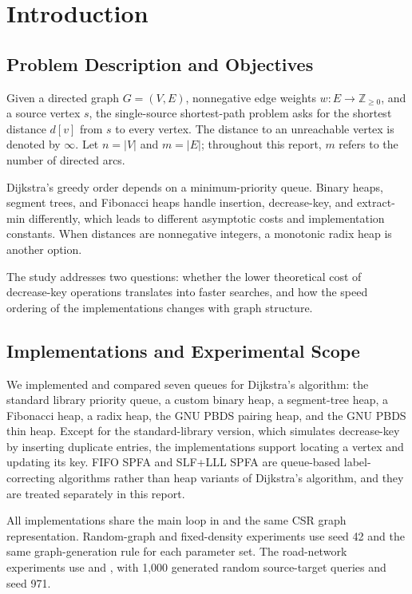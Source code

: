 \section{Introduction}
\label{sec:intro}
\subsection{Problem Description and Objectives}
Given a directed graph $G=(V,E)$, nonnegative edge weights
$w:E\to\mathbb{Z}_{\ge0}$, and a source vertex $s$, the single-source shortest-path
problem asks for the shortest distance $d[v]$ from $s$ to every vertex. The distance
to an unreachable vertex is denoted by $\infty$. Let $n=|V|$ and $m=|E|$; throughout
this report, $m$ refers to the number of directed arcs.

Dijkstra's greedy order depends on a minimum-priority queue. Binary heaps, segment
trees, and Fibonacci heaps handle insertion, decrease-key, and extract-min
differently, which leads to different asymptotic costs and implementation constants.
When distances are nonnegative integers, a monotonic radix heap is another option.

The study addresses two questions: whether the lower theoretical cost of
decrease-key operations translates into faster searches, and how the speed ordering
of the implementations changes with graph structure.

\subsection{Implementations and Experimental Scope}
We implemented and compared seven queues for Dijkstra's algorithm: the standard
library priority queue, a custom binary heap, a segment-tree heap, a Fibonacci heap,
a radix heap, the GNU PBDS pairing heap, and the GNU PBDS thin heap. Except for the
standard-library version, which simulates decrease-key by inserting duplicate
entries, the implementations support locating a vertex and updating its key.
FIFO SPFA and SLF+LLL SPFA are queue-based label-correcting algorithms rather than
heap variants of Dijkstra's algorithm, and they are treated separately in this report.

All implementations share the main loop in  and the same
CSR graph representation. Random-graph and fixed-density experiments use seed 42
and the same graph-generation rule for each parameter set. The road-network
experiments use  and , with 1,000 generated
random source-target queries and seed 971.

